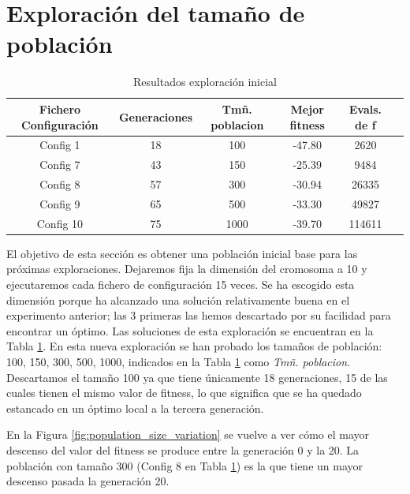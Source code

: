 \section{Exploración del tamaño de población}

\begin{table}[]
    \centering
    \begin{tabular}{||c|c|c|c|c|c||}
        \hline
        \textbf{Fichero Configuración} & \textbf{Generaciones} & \textbf{Tmñ. poblacion} & \textbf{Mejor fitness} & \textbf{Evals. de f}\\ \hline
        Config 1   & 18    & 100   & -47.80    &  2620   \\ \hline
        Config 7   & 43    & 150   & -25.39    &  9484   \\ \hline
        Config 8   & 57    & 300   & -30.94    &  26335  \\ \hline
        Config 9   & 65    & 500   & -33.30    &  49827  \\ \hline
        Config 10  & 75    & 1000  & -39.70    &  114611 \\ \hline
    \end{tabular}
    \caption{Resultados exploración inicial}
    \label{tab:base_population}
\end{table}

El objetivo de esta sección es obtener una población inicial base para las próximas exploraciones. Dejaremos fija la dimensión del cromosoma a 10 y
ejecutaremos cada fichero de configuración 15 veces. Se ha escogido esta dimensión porque ha alcanzado una solución 
relativamente buena en el experimento anterior; las 3 primeras las hemos descartado por su facilidad para encontrar un 
óptimo. Las soluciones de esta exploración se encuentran en la Tabla \ref{tab:base_population}. En esta nueva exploración se 
han probado los tamaños de población: 100, 150, 300, 500, 1000, indicados en la Tabla \ref{tab:base_population}
como \textit{Tmñ. poblacion}. Descartamos el tamaño 100 ya que tiene únicamente 18 generaciones, 15 de las cuales tienen el mismo
valor de fitness, lo que significa que se ha quedado estancado en un óptimo local a la tercera generación.

En la Figura \ref{fig:population_size_variation} se vuelve a ver cómo el mayor descenso del valor del fitness se produce
entre la generación 0 y la 20. La población con tamaño 300 (Config 8 en Tabla \ref{tab:base_population}) es la que tiene
un mayor descenso pasada la generación 20. 

